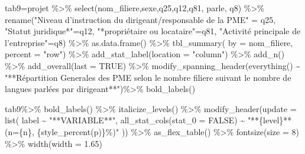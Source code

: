 \documentclass[
  letterpaper,
  DIV=11,
  numbers=noendperiod]{scrartcl}
\newenvironment{Shaded}{\begin{snugshade}}{\end{snugshade}}
\newcommand{\AttributeTok}[1]{\textcolor[rgb]{0.40,0.45,0.13}{#1}}
\newcommand{\ConstantTok}[1]{\textcolor[rgb]{0.56,0.35,0.01}{#1}}
\newcommand{\DecValTok}[1]{\textcolor[rgb]{0.68,0.00,0.00}{#1}}
\newcommand{\FloatTok}[1]{\textcolor[rgb]{0.68,0.00,0.00}{#1}}
\newcommand{\FunctionTok}[1]{\textcolor[rgb]{0.28,0.35,0.67}{#1}}
\newcommand{\NormalTok}[1]{\textcolor[rgb]{0.00,0.23,0.31}{#1}}
\newcommand{\OtherTok}[1]{\textcolor[rgb]{0.00,0.23,0.31}{#1}}
\newcommand{\SpecialCharTok}[1]{\textcolor[rgb]{0.37,0.37,0.37}{#1}}
\newcommand{\StringTok}[1]{\textcolor[rgb]{0.13,0.47,0.30}{#1}}
\begin{document}
\begin{Shaded}
\begin{Highlighting}[]
\NormalTok{tab9}\OtherTok{=}\NormalTok{projet }\SpecialCharTok{\%\textgreater{}\%}
  \FunctionTok{select}\NormalTok{(nom\_filiere,sexe,q25,q12,q81, parle, q8) }\SpecialCharTok{\%\textgreater{}\%}
    \FunctionTok{rename}\NormalTok{(}\StringTok{"Niveau d’instruction du dirigeant/responsable de la PME"} \OtherTok{=}\NormalTok{ q25, }
         \StringTok{"Statut juridique*"}\OtherTok{=}\NormalTok{q12, }\StringTok{"*propriétaire ou locataire"}\OtherTok{=}\NormalTok{q81, }\StringTok{"Activité principale de l’entreprise"}\OtherTok{=}\NormalTok{q8) }\SpecialCharTok{\%\textgreater{}\%}
      \FunctionTok{as.data.frame}\NormalTok{() }\SpecialCharTok{\%\textgreater{}\%}
        \FunctionTok{tbl\_summary}\NormalTok{(}
                    \AttributeTok{by =}\NormalTok{ nom\_filiere,}
                    \AttributeTok{percent =} \StringTok{"row"}\NormalTok{) }\SpecialCharTok{\%\textgreater{}\%}
            \FunctionTok{add\_stat\_label}\NormalTok{(}\AttributeTok{location =} \StringTok{"column"}\NormalTok{) }\SpecialCharTok{\%\textgreater{}\%}
              \FunctionTok{add\_n}\NormalTok{() }\SpecialCharTok{\%\textgreater{}\%}
                \FunctionTok{add\_overall}\NormalTok{(}\AttributeTok{last =} \ConstantTok{TRUE}\NormalTok{) }\SpecialCharTok{\%\textgreater{}\%} 
                    \FunctionTok{modify\_spanning\_header}\NormalTok{(}\FunctionTok{everything}\NormalTok{() }\SpecialCharTok{\textasciitilde{}} \StringTok{"**Répartition Generales des PME selon le nombre  filiere suivant le nombre de langues parlées par dirigeant**"}\NormalTok{)}\SpecialCharTok{\%\textgreater{}\%} 
                    \FunctionTok{bold\_labels}\NormalTok{()}

\NormalTok{tab9}\SpecialCharTok{\%\textgreater{}\%} \FunctionTok{bold\_labels}\NormalTok{() }\SpecialCharTok{\%\textgreater{}\%} 
  \FunctionTok{italicize\_levels}\NormalTok{()  }\SpecialCharTok{\%\textgreater{}\%} 
  \FunctionTok{modify\_header}\NormalTok{(}\AttributeTok{update =} \FunctionTok{list}\NormalTok{( label }\SpecialCharTok{\textasciitilde{}} \StringTok{"**VARIABLE**"}\NormalTok{, }\FunctionTok{all\_stat\_cols}\NormalTok{(}\AttributeTok{stat\_0 =} \ConstantTok{FALSE}\NormalTok{) }\SpecialCharTok{\textasciitilde{}} \StringTok{"**\{level\}** (n=\{n\}, \{style\_percent(p)\}\%)"}
\NormalTok{  )) }\SpecialCharTok{\%\textgreater{}\%}  \FunctionTok{as\_flex\_table}\NormalTok{() }\SpecialCharTok{\%\textgreater{}\%}
  \FunctionTok{fontsize}\NormalTok{(}\AttributeTok{size =} \DecValTok{8}\NormalTok{) }\SpecialCharTok{\%\textgreater{}\%}
  \FunctionTok{width}\NormalTok{(}\AttributeTok{width =} \FloatTok{1.65}\NormalTok{)}
\end{Highlighting}
\end{Shaded}
\end{document}
